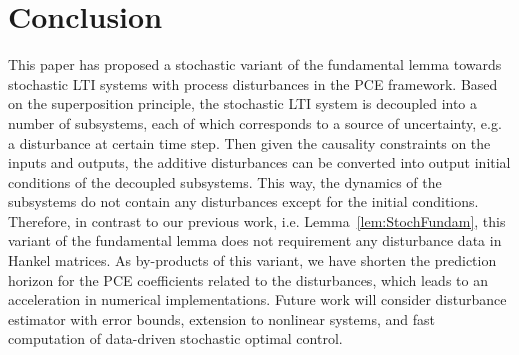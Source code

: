 \section{Conclusion} \label{sec:Conclusion}
This paper has proposed a stochastic variant of the fundamental lemma towards stochastic LTI systems with process disturbances in the PCE framework. Based on the superposition principle, the stochastic LTI system is decoupled into a number of subsystems, each of which corresponds to a source of uncertainty, e.g. a disturbance at certain time step. Then given the causality constraints on the inputs and outputs, the additive disturbances can be converted into output initial conditions of the decoupled subsystems. This way, the dynamics of the subsystems do not contain any disturbances except for the initial conditions. Therefore, in contrast to our previous work, i.e. Lemma~\ref{lem:StochFundam}, this variant of the fundamental lemma does not requirement any disturbance data in Hankel matrices. As by-products of this variant, we have shorten the prediction horizon for the PCE coefficients related to the disturbances, which leads to an acceleration in numerical implementations. Future work will consider disturbance estimator with error bounds, extension to nonlinear systems, and fast computation of data-driven stochastic optimal control.